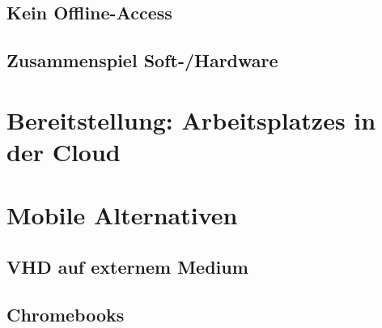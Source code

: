 \subsection{Kein Offline-Access}
\subsection{Zusammenspiel Soft-/Hardware}



\section{Bereitstellung: Arbeitsplatzes in der Cloud}



\section{Mobile Alternativen}

\subsection{VHD auf externem Medium}

\subsection{Chromebooks}


